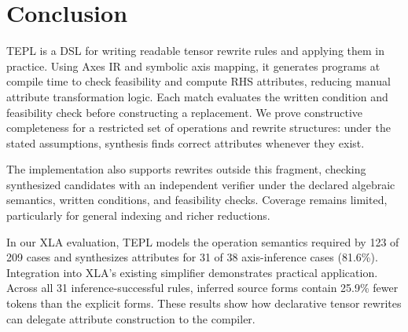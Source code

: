 \section{Conclusion}
\label{sec:conclusion}
TEPL is a DSL for writing readable tensor rewrite rules and applying them in
practice. Using Axes IR and symbolic axis mapping, it generates programs at
compile time to check feasibility and compute RHS attributes, reducing
manual attribute transformation logic. Each match evaluates the written
condition and feasibility check before constructing a replacement. We prove constructive completeness for a restricted
set of operations and rewrite structures: under the stated assumptions,
synthesis finds correct attributes whenever they exist.

The implementation also supports rewrites outside this fragment, checking
synthesized candidates with an independent verifier under the declared
algebraic semantics, written conditions, and feasibility checks.
Coverage remains limited, particularly for general indexing and richer reductions.

In our XLA evaluation, TEPL models the operation semantics required by 123
of 209 cases and synthesizes attributes for 31 of 38 axis-inference cases (81.6\%).
Integration into XLA's existing simplifier demonstrates practical
application. Across all 31 inference-successful rules, inferred source
forms contain 25.9\% fewer tokens than the explicit forms.
These results show how declarative tensor rewrites can delegate attribute
construction to the compiler.
